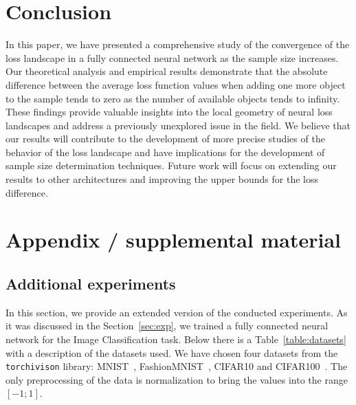 \documentclass{article}
\begin{document}
\section{Conclusion}\label{sec:concl}

In this paper, we have presented a comprehensive study of the convergence of the loss landscape in a fully connected neural network as the sample size increases. Our theoretical analysis and empirical results demonstrate that the absolute difference between the average loss function values when adding one more object to the sample tends to zero as the number of available objects tends to infinity. These findings provide valuable insights into the local geometry of neural loss landscapes and address a previously unexplored issue in the field. We believe that our results will contribute to the development of more precise studies of the behavior of the loss landscape and have implications for the development of sample size determination techniques. Future work will focus on extending our results to other architectures and improving the upper bounds for the loss difference.







\newpage
\appendix
\section{Appendix / supplemental material}\label{app}

\subsection{Additional experiments}\label{app:exp}

In this section, we provide an extended version of the conducted experiments. As it was discussed in the Section~\ref{sec:exp}, we trained a fully connected neural network for the Image Classification task. Below there is a Table~\ref{table:datasets} with a description of the datasets used. We have chosen four datasets from the \texttt{torchivison} library: MNIST~\cite{deng2012mnist}, FashionMNIST~\cite{xiao2017fashionmnistnovelimagedataset}, CIFAR10 and CIFAR100~\cite{krizhevsky2009learning}. The only preprocessing of the data is normalization to bring the values into the range $[-1; 1]$.
\end{document}
